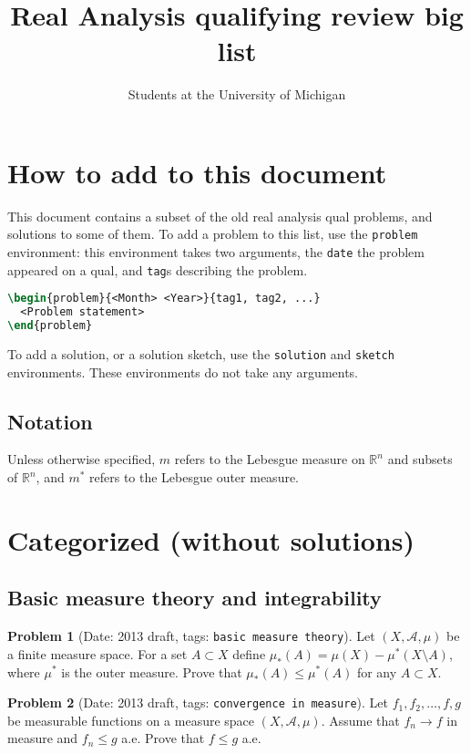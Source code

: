 \documentclass[11pt, notitlepage]{article}
\title{Real Analysis qualifying review big list}
\author{Students at the University of Michigan}
\theoremstyle{definition}
\theoremstyle{definition}
\theoremstyle{definition}
\newtheorem{probstate}{Problem}
\theoremstyle{remark}
\newenvironment{problem}[2]{
    \begin{probstate}[Date: #1, tags: {\color{white} \texttt{#2}}]
}
{
  \end{probstate}
}
\begin{document}
\maketitle

\tableofcontents

\section*{How to add to this document}
This document contains a subset of the old real analysis qual problems, and solutions to some of them.
To add a problem to this list, use the \texttt{problem} environment: this environment takes two arguments, the \texttt{date} the problem appeared on a qual, and \texttt{tag}s describing the problem.
\begin{lstlisting}[language=TeX]
\begin{problem}{<Month> <Year>}{tag1, tag2, ...}
  <Problem statement>
\end{problem}
\end{lstlisting}

To add a solution, or a solution sketch, use the \texttt{solution} and \texttt{sketch} environments.
These environments do not take any arguments.

\subsection*{Notation}
Unless otherwise specified, $m$ refers to the Lebesgue measure on $\mathbb{R}^n$ and subsets of $\mathbb{R}^n$, and $m^{\ast}$ refers to the Lebesgue outer measure.

\section{Categorized (without solutions)}

\subsection{Basic measure theory and integrability}


\begin{problem}{2013 draft}{basic measure theory}
Let $(X, \mathcal{A},\mu)$ be a finite measure space. For a set $A \subset X$ define $\mu_*(A)=\mu(X)-\mu^*(X \setminus A)$, where $\mu^*$ is the outer measure. Prove that $\mu_*(A) \le \mu^*(A)$ for any $A \subset X$.
\end{problem}


\begin{problem}{2013 draft}{convergence in measure}
Let $f_1, f_2, \ldots, f, g$ be measurable functions on a measure space  $(X, \mathcal{A},\mu)$. Assume that $f_n \to f$ in measure and $f_n \le g$ a.e. Prove that $f \le g$ a.e.
\end{problem}
\end{document}
